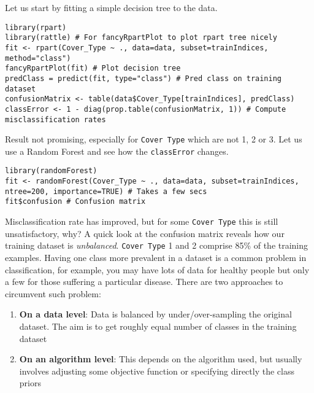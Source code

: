 \documentclass[a4paper,11pt]{article}
\begin{document}
Let us start by fitting a simple decision tree to the data.
\\
\begin{lstlisting}[style=RCode]
library(rpart)
library(rattle) # For fancyRpartPlot to plot rpart tree nicely
fit <- rpart(Cover_Type ~ ., data=data, subset=trainIndices, method="class")
fancyRpartPlot(fit) # Plot decision tree
predClass = predict(fit, type="class") # Pred class on training dataset
confusionMatrix <- table(data$Cover_Type[trainIndices], predClass)
classError <- 1 - diag(prop.table(confusionMatrix, 1)) # Compute misclassification rates
\end{lstlisting}

Result not promising, especially for \texttt{Cover Type} which are not 1, 2 or 3. Let
us use a Random Forest and see how the \texttt{classError} changes. 
\\
\begin{lstlisting}[style=RCode]
library(randomForest)
fit <- randomForest(Cover_Type ~ ., data=data, subset=trainIndices, ntree=200, importance=TRUE) # Takes a few secs
fit$confusion # Confusion matrix
\end{lstlisting}

Misclassification rate has improved, but for some \texttt{Cover Type} this is still unsatisfactory,
why? A quick look at the confusion matrix reveals how our training dataset is \textit{unbalanced}. 
\texttt{Cover Type} 1 and 2 comprise 85\% of the training examples. Having one class more prevalent
in a dataset is a common problem in classification, for example, you may have lots of data
for healthy people but only a few for those suffering a particular disease. There are two
approaches to circumvent such problem:

\begin{enumerate}
	\item \textbf{On a data level}: Data is balanced by under/over-sampling the original dataset. The aim is to get roughly
	equal number of classes in the training dataset
	\item \textbf{On an algorithm level}: This depends on the algorithm used, but usually involves adjusting some objective function 
	or specifying directly the class priors
\end{enumerate}
\end{document}
